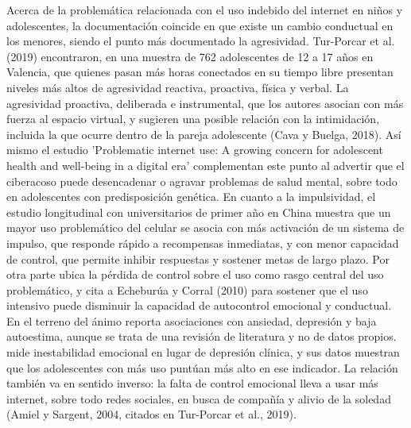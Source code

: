 \documentclass[10pt,letterpaper]{article}
\begin{document}
Acerca de la problemática relacionada con el uso indebido del internet en niños y adolescentes, la documentación coincide en que existe un cambio conductual en los menores, siendo el punto más documentado la agresividad. Tur-Porcar et al. (2019) \citep{eficacia_academica} encontraron, en una muestra de 762 adolescentes de 12 a 17 años en Valencia, que quienes pasan más horas conectados en su tiempo libre presentan niveles más altos de agresividad reactiva, proactiva, física y verbal. La agresividad proactiva, deliberada e instrumental,  que los autores asocian con más fuerza al espacio virtual, y sugieren una posible relación con la intimidación, incluida la que ocurre dentro de la pareja adolescente (Cava y Buelga, 2018)\citep{eficacia_academica}. Así mismo el estudio 'Problematic internet use: A growing concern for adolescent health and well-being in a digital era'  \citep{dadi2024adolescents} complementan este punto al advertir que el ciberacoso puede desencadenar o agravar problemas de salud mental, sobre todo en adolescentes con predisposición genética.
En cuanto a la impulsividad, el estudio longitudinal con universitarios de primer año en China \citep{mobile_addiction} muestra que un mayor uso problemático del celular se asocia con más activación de un sistema de impulso, que responde rápido a recompensas inmediatas, y con menor capacidad de control, que permite inhibir respuestas y sostener metas de largo plazo. Por otra parte \citep{dadi2024adolescents} ubica la pérdida de control sobre el uso como rasgo central del uso problemático, y \citep{eficacia_academica} cita a Echeburúa y Corral (2010) para sostener que el uso intensivo puede disminuir la capacidad de autocontrol emocional y conductual. En el terreno del ánimo \citep{dadi2024adolescents} reporta asociaciones con ansiedad, depresión y baja autoestima, aunque se trata de una revisión de literatura y no de datos propios. \citep{eficacia_academica} mide inestabilidad emocional en lugar de depresión clínica, y sus datos muestran que los adolescentes con más uso puntúan más alto en ese indicador. La relación también va en sentido inverso: la falta de control emocional lleva a usar más internet, sobre todo redes sociales, en busca de compañía y alivio de la soledad (Amiel y Sargent, 2004, citados en Tur-Porcar et al., 2019).
\end{document}
